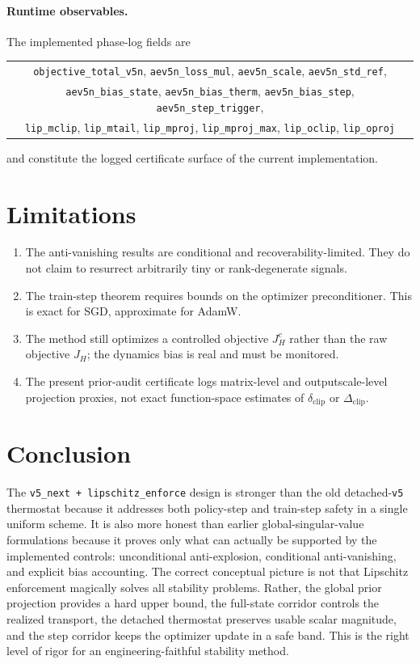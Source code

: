 \documentclass[11pt]{article}
\newcommand{\1}{\mathbf{1}}
\begin{document}
\paragraph{Runtime observables.}
The implemented phase-log fields are
\begin{center}
\begin{tabular}{c}
\texttt{objective\_total\_v5n}, \texttt{aev5n\_loss\_mul}, \texttt{aev5n\_scale}, \texttt{aev5n\_std\_ref},\\
\texttt{aev5n\_bias\_state}, \texttt{aev5n\_bias\_therm}, \texttt{aev5n\_bias\_step}, \texttt{aev5n\_step\_trigger},\\
\texttt{lip\_mclip}, \texttt{lip\_mtail}, \texttt{lip\_mproj}, \texttt{lip\_mproj\_max}, \texttt{lip\_oclip}, \texttt{lip\_oproj}
\end{tabular}
\end{center}
and constitute the logged certificate surface of the current implementation.

\section{Limitations}
\begin{enumerate}[label=\arabic*.]
  \item The anti-vanishing results are conditional and recoverability-limited. They do not claim to resurrect arbitrarily tiny or rank-degenerate signals.
  \item The train-step theorem requires bounds on the optimizer preconditioner. This is exact for SGD, approximate for AdamW.
  \item The method still optimizes a controlled objective $J_H^c$ rather than the raw objective $J_H$; the dynamics bias is real and must be monitored.
  \item The present prior-audit certificate logs matrix-level and outputscale-level projection proxies, not exact function-space estimates of $\delta_{\mathrm{clip}}$ or $\Delta_{\mathrm{clip}}$.
\end{enumerate}

\section{Conclusion}
The \texttt{v5\_next + lipschitz\_enforce} design is stronger than the old detached-\texttt{v5} thermostat because it addresses both policy-step and train-step safety in a single uniform scheme. It is also more honest than earlier global-singular-value formulations because it proves only what can actually be supported by the implemented controls: unconditional anti-explosion, conditional anti-vanishing, and explicit bias accounting. The correct conceptual picture is not that Lipschitz enforcement magically solves all stability problems. Rather, the global prior projection provides a hard upper bound, the full-state corridor controls the realized transport, the detached thermostat preserves usable scalar magnitude, and the step corridor keeps the optimizer update in a safe band. This is the right level of rigor for an engineering-faithful stability method.
\end{document}
